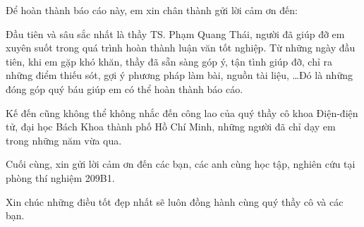 Để hoàn thành báo cáo này, em xin chân thành gửi lời cảm ơn đến:

Đầu tiên và sâu sắc nhất là thầy TS. Phạm Quang Thái, người đã giúp đỡ em xuyên suốt trong quá trình hoàn thành luận văn tốt nghiệp. Từ những ngày đầu tiên, khi em gặp khó khăn, thầy đã sẵn sàng góp ý, tận tình giúp đỡ, chỉ ra những điểm thiếu sót, gợi ý phương pháp làm bài, nguồn tài liệu, …Đó là những đóng góp quý báu giúp em có thể hoàn thành báo cáo.

Kế đến cũng không thể không nhắc đến công lao của quý thầy cô khoa Điện-điện tử, đại học Bách Khoa thành phố Hồ Chí Minh, những người đã chỉ dạy em trong những năm vừa qua.

Cuối cùng, xin gửi lời cảm ơn đến các bạn, các anh cùng học tập, nghiên cứu tại phòng thí nghiệm 209B1.

Xin chúc những điều tốt đẹp nhất sẽ luôn đồng hành cùng quý thầy cô và các bạn.